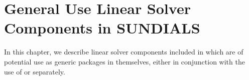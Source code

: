 \chapter{General Use Linear Solver Components in SUNDIALS}\label{s:gen_linsolv}
In this chapter, we describe linear solver components
included in {\sundials} which are of potential use as generic packages in
themselves, either in conjunction with the use of {\kinsol} or separately.


